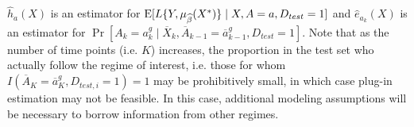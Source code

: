 $\widehat{h}_a(X)$ is an estimator for $\operatorname{E}[L\{Y, \mu_{\widehat{\beta}}(X^*)\}\mid X,A = a, D_{test} = 1]$ and $\widehat{e}_{a_k}(X)$ is an estimator for $\Pr[A_k = a^g_k \mid \overline{X}_k, \overline{A}_{k-1} = \overline{a}^g_{k-1}, D_{test} = 1]$. Note that as the number of time points (i.e. $K$) increases, the proportion in the test set who actually follow the regime of interest, i.e. those for whom $I(\overline{A}_K = \overline{a}^g_K, D_{test,i} = 1)=1$ may be prohibitively small, in which case plug-in estimation may not be feasible. In this case, additional modeling assumptions will be necessary to borrow information from other regimes.
\newpage




